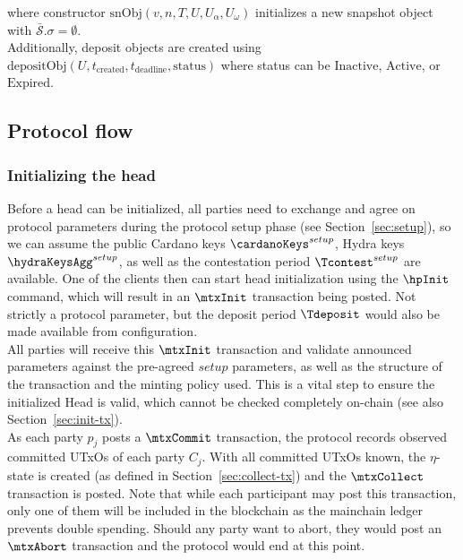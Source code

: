 where constructor $\text{snObj}(v, n, T, U, U_\alpha, U_\omega)$ initializes a
new snapshot object with $\bar{\mathcal{S}}.\sigma = \emptyset$. \\

Additionally, deposit objects are created using
$\text{depositObj}(U, t_{\text{created}}, t_{\text{deadline}}, \text{status})$
where status can be $\text{Inactive}$, $\text{Active}$, or $\text{Expired}$.

\subsection{Protocol flow}

\subsubsection{Initializing the head}

\quad Before a head can be initialized, all parties need
to exchange and agree on protocol parameters during the protocol setup phase
(see Section~\ref{sec:setup}), so we can assume the public Cardano keys
$\cardanoKeys^{setup}$, Hydra keys $\hydraKeysAgg^{setup}$, as well as the
contestation period $\Tcontest^{setup}$ are available. One of the clients then
can start head initialization using the $\hpInit$ command, which will result in
an $\mtxInit$ transaction being posted. Not strictly a protocol parameter, but
the deposit period $\Tdeposit$ would also be made available from
configuration.\\

\quad All parties will receive this $\mtxInit$
transaction and validate announced parameters against the pre-agreed $setup$
parameters, as well as the structure of the transaction and the minting policy
used. This is a vital step to ensure the initialized Head is valid, which cannot
be checked completely on-chain (see also Section~\ref{sec:init-tx}). \\

\quad As each party $p_{j}$ posts a
$\mtxCommit$ transaction, the protocol records observed committed UTxOs of each
party $C_j$. With all committed UTxOs known, the $\eta$-state is created (as
defined in Section~\ref{sec:collect-tx}) and the $\mtxCollect$ transaction is
posted. Note that while each participant may post this transaction, only one of
them will be included in the blockchain as the mainchain ledger prevents double
spending. Should any party want to abort, they would post an $\mtxAbort$
transaction and the protocol would end at this point.\\

